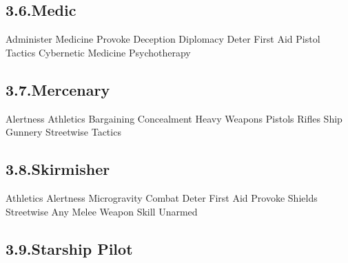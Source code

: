 \documentclass{article}
\begin{document}
\subsection{3.6.\hspace*{0.5em}Medic}\label{sec-medic}%

\noindent{}Administer Medicine\mdbr
{}Provoke\mdbr
{}Deception \mdbr
{}Diplomacy\mdbr
{}Deter\mdbr
{}First Aid\mdbr
{}Pistol\mdbr
{}Tactics\mdbr
{}Cybernetic Medicine\mdbr
{}Psychotherapy %

\subsection{3.7.\hspace*{0.5em}Mercenary}\label{sec-mercenary}%

\noindent{}Alertness\mdbr
{}Athletics\mdbr
{}Bargaining\mdbr
{}Concealment\mdbr
{}Heavy Weapons\mdbr
{}Pistols\mdbr
{}Rifles\mdbr
{}Ship Gunnery\mdbr
{}Streetwise\mdbr
{}Tactics %

\subsection{3.8.\hspace*{0.5em}Skirmisher}\label{sec-skirmisher}%

\noindent{}Athletics\mdbr
{}Alertness\mdbr
{}Microgravity Combat\mdbr
{}Deter\mdbr
{}First Aid\mdbr
{}Provoke\mdbr
{}Shields\mdbr
{}Streetwise\mdbr
{}Any Melee Weapon Skill\mdbr
{}Unarmed %

\subsection{3.9.\hspace*{0.5em}Starship Pilot}\label{sec-starship-pilot}%
\end{document}
